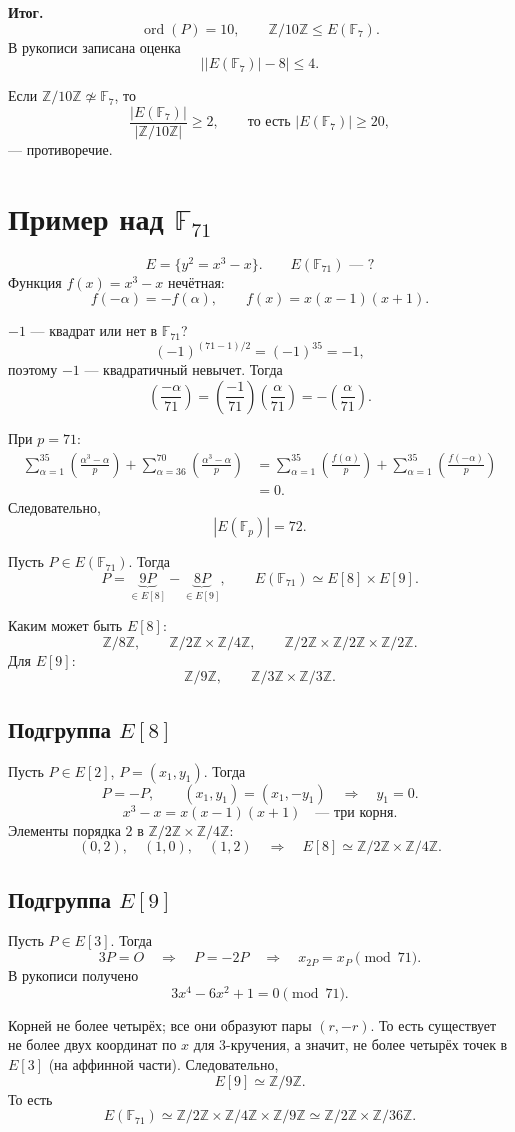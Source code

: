 \documentclass[12pt,a4paper]{article}
\newcommand{\Z}{\mathbb Z}
\newcommand{\F}{\mathbb F}
\DeclareMathOperator{\ord}{ord}
\newcommand{\leg}[2]{\left(\frac{#1}{#2}\right)}
\begin{document}
\newpage
\textbf{Итог.}
\[
\ord(P)=10,\qquad \Z/10\Z\le E(\F_7).
\]
В рукописи записана оценка
\[
\bigl||E(\F_7)|-8\bigr|\le4.
\]

Если $\Z/10\Z\not\simeq\F_7$,
то
\[
\frac{|E(\F_7)|}{|\Z/10\Z|}\ge2,
\qquad\text{то есть }|E(\F_7)|\ge20,
\]
--- противоречие.

\section{Пример над $\F_{71}$}
\[
E=\{y^2=x^3-x\}.\qquad E(\F_{71})\text{ --- ?}
\]
Функция $f(x)=x^3-x$ нечётная:
\[
f(-\alpha)=-f(\alpha),\qquad f(x)=x(x-1)(x+1).
\]

$-1$ --- квадрат или нет в $\F_{71}$?
\[
(-1)^{(71-1)/2}=(-1)^{35}=-1,
\]
поэтому $-1$ --- квадратичный невычет. Тогда
\[
\leg{-\alpha}{71}
=\leg{-1}{71}\leg{\alpha}{71}
=-\leg{\alpha}{71}.
\]

При $p=71$:
\begin{align*}
\sum_{\alpha=1}^{35}\leg{\alpha^3-\alpha}{p}
+\sum_{\alpha=36}^{70}\leg{\alpha^3-\alpha}{p}
&=\sum_{\alpha=1}^{35}\leg{f(\alpha)}{p}
+\sum_{\alpha=1}^{35}\leg{f(-\alpha)}{p}\\
&=0.
\end{align*}
Следовательно,
\[
|E(\F_p)|=72.
\]

Пусть $P\in E(\F_{71})$. Тогда
\[
P=\underbrace{9P}_{\in E[8]}-\underbrace{8P}_{\in E[9]},
\qquad E(\F_{71})\simeq E[8]\times E[9].
\]

\newpage
Каким может быть $E[8]$:
\[
\Z/8\Z,\qquad \Z/2\Z\times\Z/4\Z,\qquad
\Z/2\Z\times\Z/2\Z\times\Z/2\Z.
\]
Для $E[9]$:
\[
\Z/9\Z,\qquad \Z/3\Z\times\Z/3\Z.
\]

\subsection*{Подгруппа $E[8]$}
Пусть $P\in E[2]$, $P=(x_1,y_1)$. Тогда
\[
P=-P,\qquad (x_1,y_1)=(x_1,-y_1)\quad\Longrightarrow\quad y_1=0.
\]
\[
x^3-x=x(x-1)(x+1)\quad\text{--- три корня}.
\]
Элементы порядка $2$ в $\Z/2\Z\times\Z/4\Z$:
\[
(0,2),\quad(1,0),\quad(1,2)
\quad\Longrightarrow\quad E[8]\simeq\Z/2\Z\times\Z/4\Z.
\]

\subsection*{Подгруппа $E[9]$}
Пусть $P\in E[3]$. Тогда
\[
3P=O\quad\Longrightarrow\quad P=-2P
\quad\Longrightarrow\quad x_{2P}=x_P\pmod{71}.
\]
В рукописи получено
\[
3x^4-6x^2+1=0\pmod{71}.
\]

Корней не более четырёх; все они образуют пары $(r,-r)$.
То есть существует не более двух координат по $x$ для $3$-кручения,
а значит, не более четырёх точек в $E[3]$ (на аффинной части).
Следовательно,
\[
E[9]\simeq\Z/9\Z.
\]
То есть
\[
E(\F_{71})\simeq\Z/2\Z\times\Z/4\Z\times\Z/9\Z
\simeq\Z/2\Z\times\Z/36\Z.
\]
\end{document}
